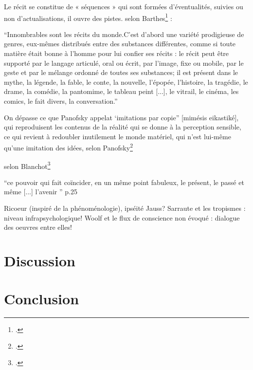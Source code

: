 \documentclass[a4paper,10pt]{article}
\begin{document}
			Le récit se constitue de « séquences » qui sont
			formées d’éventualités, suivies ou non d’actualisations, il ouvre des pistes.
			selon Barthes\footcite{Barthes1966} :
			\begin{center}
				\footnotesize
				\begin{minipage}{0.7\textwidth}
					``Innombrables sont les récits du monde.C'est d'abord une variété prodigieuse de genres, eux-mêmes distribués entre des substances différentes, comme si toute matière était bonne à l'homme pour lui confier ses récits : le récit peut être supporté par le langage articulé, oral ou écrit, par l'image, fixe ou mobile, par le geste et par le mélange ordonné de toutes ses substances; il est présent dans le mythe, la légende, la fable, le conte, la nouvelle, l'épopée, l'histoire, la tragédie, le drame, la comédie, la pantomime, le tableau peint [...], le vitrail, le cinéma, les comics, le fait divers, la conversation.''
				\end{minipage}
			\end{center}
			On dépasse ce que Panofsky appelat  ‘imitations par copie'' [mimésis eikastiké], qui reproduisent les contenus de la réalité qui se donne à la perception sensible,
			ce qui revient à redoubler inutilement le monde matériel, qui n’est lui-même qu’une imitation des
			idées, selon Panofsky\footcite{Panofsky1983}
			
			
			selon Blanchot\footcite{Blanchot1959}
			\begin{center}
				\footnotesize
				\begin{minipage}{0.7\textwidth}
					``ce pouvoir qui fait coïncider, en un même point fabuleux, le présent, le passé et même [...] l'avenir '' p.25
				\end{minipage}
			\end{center}
			
			Ricoeur (inspiré de la phénoménologie), ipséité
			Jauss?
			Sarraute et les tropismes : niveau infrapsychologique!
			Woolf et le flux de conscience
			non évoqué : dialogue des oeuvres entre elles!
	\section{Discussion}
	\section*{Conclusion}
\end{document}
